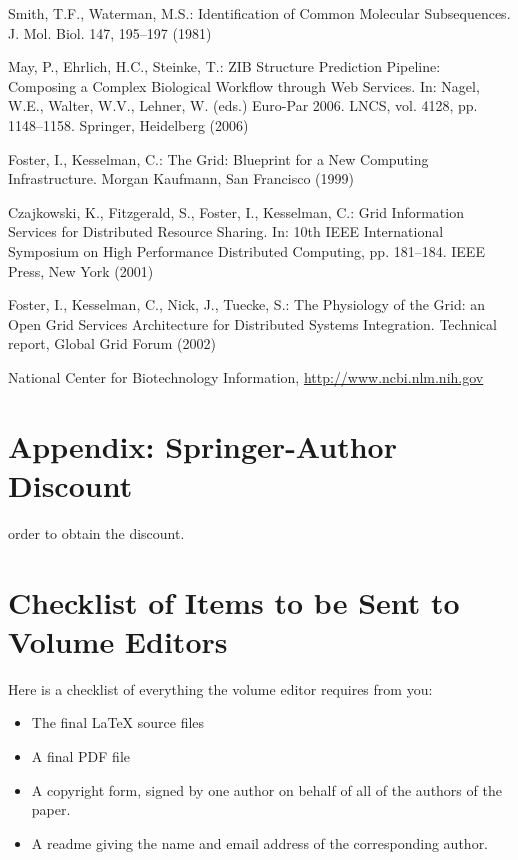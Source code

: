 \documentclass[runningheads,a4paper]{llncs}
\begin{document}
\begin{thebibliography}{4}

 Smith, T.F., Waterman, M.S.: Identification of Common Molecular
Subsequences. J. Mol. Biol. 147, 195--197 (1981)

 May, P., Ehrlich, H.C., Steinke, T.: ZIB Structure Prediction Pipeline:
Composing a Complex Biological Workflow through Web Services. In: Nagel,
W.E., Walter, W.V., Lehner, W. (eds.) Euro-Par 2006. LNCS, vol. 4128,
pp. 1148--1158. Springer, Heidelberg (2006)

 Foster, I., Kesselman, C.: The Grid: Blueprint for a New Computing
Infrastructure. Morgan Kaufmann, San Francisco (1999)

 Czajkowski, K., Fitzgerald, S., Foster, I., Kesselman, C.: Grid
Information Services for Distributed Resource Sharing. In: 10th IEEE
International Symposium on High Performance Distributed Computing, pp.
181--184. IEEE Press, New York (2001)

 Foster, I., Kesselman, C., Nick, J., Tuecke, S.: The Physiology of the
Grid: an Open Grid Services Architecture for Distributed Systems
Integration. Technical report, Global Grid Forum (2002)

 National Center for Biotechnology Information, \url{http://www.ncbi.nlm.nih.gov}

\end{thebibliography}


\section*{Appendix: Springer-Author Discount}

order to obtain the discount.

\section{Checklist of Items to be Sent to Volume Editors}
Here is a checklist of everything the volume editor requires from you:


\begin{itemize}
\settowidth{\leftmargin}{{\Large$\square$}}\advance\leftmargin{}
\itemsep8pt\relax
\renewcommand\labelitemi{{\lower1.5pt\hbox{\Large$\square$}}}

\item The final \LaTeX{} source files
\item A final PDF file
\item A copyright form, signed by one author on behalf of all of the
authors of the paper.
\item A readme giving the name and email address of the
corresponding author.
\end{itemize}
\end{document}
